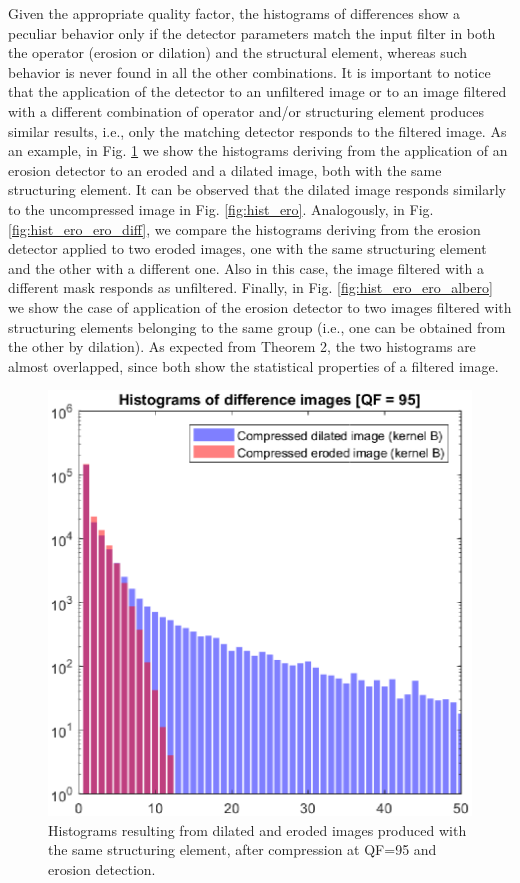 \documentclass[review]{elsarticle}
\begin{document}
Given the appropriate quality factor, the histograms of differences show a peculiar behavior only if the detector parameters match the input filter in both the operator (erosion or dilation) and the structural element, whereas such behavior is never found in all the other combinations. It is important to notice that the application of the detector to an unfiltered image or to an image filtered with a different combination of operator and/or structuring element produces similar results, i.e., only the matching detector responds to the filtered image. As an example, in Fig. \ref{fig:hist_dil_ero_same} we show the histograms deriving from the application of an erosion detector to an eroded and a dilated image, both with the same structuring element. It can be observed that the dilated image responds similarly to the uncompressed image in Fig. \ref{fig:hist_ero}. Analogously, in Fig. \ref{fig:hist_ero_ero_diff}, we compare the histograms deriving from the erosion detector applied to two eroded images, one with the same structuring element and the other with a different one. Also in this case, the image filtered with a different mask responds as unfiltered. Finally, in Fig. \ref{fig:hist_ero_ero_albero} we show the case of application of the erosion detector to two images filtered with structuring elements belonging to the same group (i.e., one can be obtained from the other by dilation). As expected from Theorem 2, the two histograms are almost overlapped, since both show the statistical properties of a filtered image.

\begin{figure}[!ht]
	\centering
	\includegraphics[scale=0.55]{hist_dil_ero_same.eps}
	\caption{Histograms resulting from dilated and eroded images produced with the same structuring element, after compression at QF=95 and erosion detection.}
	\label{fig:hist_dil_ero_same}
\end{figure}
\end{document}
